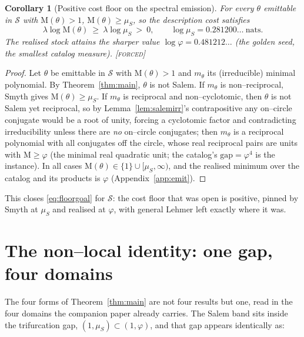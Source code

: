 \documentclass[11pt]{article}
\theoremstyle{plain}
\newtheorem{corollary}[theorem]{Corollary}
\theoremstyle{definition}
\theoremstyle{remark}
\newcommand{\forced}{\textcolor{forcedc}{\textsc{[forced]}}}
\newcommand{\Mah}{\mathrm{M}}
\newcommand{\Scal}{\mathcal{S}}
\begin{document}
\begin{corollary}[Positive cost floor on the spectral emission]\label{cor:floor}
For every $\theta$ emittable in $\Scal$ with $\Mah(\theta)>1$, $\Mah(\theta)\ge\mu_S$, so the description cost satisfies
\[
\lambda\log\Mah(\theta)\ \ge\ \lambda\log\mu_S\ >\ 0,\qquad \log\mu_S=0.281200\ldots\ \text{nats}.
\]
The realised stock attains the sharper value $\log\varphi=0.481212\ldots$ (the golden seed, the smallest catalog measure). \forced
\end{corollary}

\begin{proof}
Let $\theta$ be emittable in $\Scal$ with $\Mah(\theta)>1$ and $m_\theta$ its (irreducible) minimal polynomial. By Theorem~\ref{thm:main}, $\theta$ is not Salem. If $m_\theta$ is non--reciprocal, Smyth gives $\Mah(\theta)\ge\mu_S$. If $m_\theta$ is reciprocal and non--cyclotomic, then $\theta$ is not Salem yet reciprocal, so by Lemma~\ref{lem:salemirr}'s contrapositive any on--circle conjugate would be a root of unity, forcing a cyclotomic factor and contradicting irreducibility unless there are \emph{no} on--circle conjugates; then $m_\theta$ is a reciprocal polynomial with all conjugates off the circle, whose real reciprocal pairs are units with $\Mah\ge\varphi$ (the minimal real quadratic unit; the catalog's $\mathrm{gap}=\varphi^4$ is the instance). In all cases $\Mah(\theta)\in\{1\}\cup[\mu_S,\infty)$, and the realised minimum over the catalog and its products is $\varphi$ (Appendix~\ref{app:emit}). \end{proof}

This closes \eqref{eq:floorgoal} for $\Scal$: the cost floor that was open is positive, pinned by Smyth at $\mu_S$ and realised at $\varphi$, with general Lehmer left exactly where it was.

\section{The non--local identity: one gap, four domains}\label{sec:nonlocal}

The four forms of Theorem~\ref{thm:main} are not four results but one, read in the four domains the companion paper already carries. The Salem band sits inside the trifurcation gap, $(1,\mu_S)\subset(1,\varphi)$, and that gap appears identically as:
\end{document}
